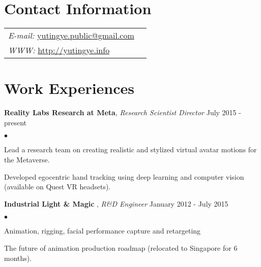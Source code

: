 \documentclass[margin,line]{res}
\newenvironment{list2}{
  \begin{list}{$\bullet$}{%
      \setlength{\itemsep}{0in}
      \setlength{\parsep}{0in} \setlength{\parskip}{0in}
      \setlength{\topsep}{0in} \setlength{\partopsep}{0in} 
      \setlength{\leftmargin}{0.2in}}}{\end{list}}
\begin{document}

\begin{resume}
\section{\sc Contact Information}
\vspace{.05in}
\begin{tabular}{@{}p{3in}p{3in}}
{\it E-mail:}    \href{mailto:yutingye.public@gmail.com}{yutingye.public@gmail.com} \\
{\it WWW:}  \href{http://yutingye.info}{http://yutingye.info} \\ 
\end{tabular}

\section{\sc Work Experiences}
{\bf Reality Labs Research at Meta}, {\em Research Scientist Director}  \hfill July 2015 - present \\
\begin{list2}
\vspace*{-.15in}
\item Lead a research team on creating realistic and stylized virtual avatar motions for the Metaverse.
\item Developed egocentric  hand tracking using deep learning and computer vision (available on Quest VR headsets).
\end{list2}

{\bf Industrial Light \& Magic} , {\em R\&D Engineer} \hfill January 2012 - July 2015 \\
\begin{list2}
\vspace*{-.15in}
\item Animation, rigging,  facial performance capture and retargeting
\item The future of animation production roadmap (relocated to Singapore for 6 months).
\end{list2}


\end{resume}
\end{document}
